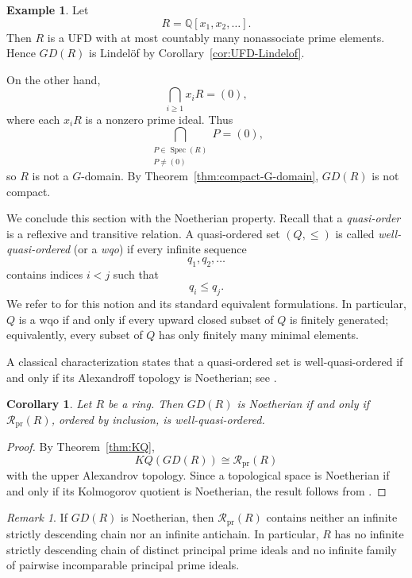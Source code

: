\documentclass[11pt]{amsart}
\theoremstyle{plain}
\newtheorem{corollary}[theorem]{Corollary}
\theoremstyle{definition}
\newtheorem{example}[theorem]{Example}
\theoremstyle{remark}
\newtheorem{remark}[theorem]{Remark}
\numberwithin{equation}{section}
\begin{document}
\begin{example}\label{ex:Lindelof-not-compact}
	Let
	\[
	R=\mathbb Q[x_1,x_2,\ldots].
	\]
	Then $R$ is a UFD with at most countably many nonassociate prime
	elements. Hence $GD(R)$ is Lindel\"of by
	Corollary~\ref{cor:UFD-Lindelof}.
	
	On the other hand,
	\[
	\bigcap_{i\geq1}x_iR=(0),
	\]
	where each $x_iR$ is a nonzero prime ideal. Thus
	\[
	\bigcap_{\substack{P\in\operatorname{Spec}(R)\\P\neq(0)}}P=(0),
	\]
	so $R$ is not a $G$-domain. By
	Theorem~\ref{thm:compact-G-domain}, $GD(R)$ is not compact.
\end{example}


We conclude this section with the Noetherian property. Recall that a
\emph{quasi-order} is a reflexive and transitive relation. A
quasi-ordered set $(Q,\leq)$ is called \emph{well-quasi-ordered}
(or a \emph{wqo}) if every infinite sequence
\[
q_1,q_2,\ldots
\]
contains indices $i<j$ such that
\[
q_i\leq q_j.
\]
We refer to \cite[Definition~2.7 and Lemma~2.1]{BuriolaSchuster}
for this notion and its standard equivalent formulations. In
particular, $Q$ is a wqo if and only if every upward closed subset of
$Q$ is finitely generated; equivalently, every subset of $Q$ has only
finitely many minimal elements.

A classical characterization states that a quasi-ordered set is
well-quasi-ordered if and only if its Alexandroff topology is
Noetherian; see
\cite[Proposition~9.7.17]{GoubaultLarrecq}.

\begin{corollary}\label{cor:Noetherian-wqo}
	Let $R$ be a ring. Then $GD(R)$ is Noetherian if and only if
	$\mathcal R_{\mathrm{pr}}(R)$, ordered by inclusion, is
	well-quasi-ordered.
\end{corollary}

\begin{proof}
	By Theorem~\ref{thm:KQ},
	\[
	KQ(GD(R))\cong \mathcal R_{\mathrm{pr}}(R)
	\]
	with the upper Alexandrov topology. Since a topological space is
	Noetherian if and only if its Kolmogorov quotient is Noetherian, the
	result follows from
	\cite[Proposition~9.7.17]{GoubaultLarrecq}.
\end{proof}

\begin{remark}\label{rem:Noetherian-primes}
If $GD(R)$ is Noetherian, then
$\mathcal R_{\mathrm{pr}}(R)$ contains neither an infinite strictly
descending chain nor an infinite antichain. In particular, $R$ has no
infinite strictly descending chain of distinct principal prime ideals
and no infinite family of pairwise incomparable principal prime ideals.
\end{remark}
\end{document}
